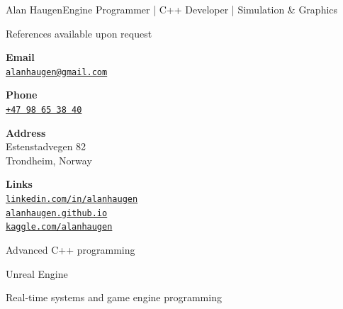\documentclass{article}
\begin{document}
\begin{cv}[avatar]{Alan Haugen}{Engine Programmer | C++ Developer | Simulation \& Graphics}
\cvseparator

\begin{cvevent}
References available upon request
\end{cvevent}

\cvsidebar


\begin{cvitem}[Envelope][4]
    \textbf{Email}\\
    \href{mailto:alanhaugen@gmail.com}{\texttt{alanhaugen@gmail.com}}
\end{cvitem}

\cvseparator[3]

\begin{cvitem}[Phone][4]
    \textbf{Phone}\\
    \href{tel:+4798653840}{\texttt{+47 98 65 38 40}}
\end{cvitem}

\cvseparator[3]

\begin{cvitem}[Home][4]
    \textbf{Address}\\
    Estenstadvegen 82\\
    Trondheim, Norway
\end{cvitem}

\cvseparator[3]

\begin{cvitem}[Globe][4]
    \textbf{Links}\\
    \href{https://linkedin.com/in/alanhaugen}{\texttt{linkedin.com/in/alanhaugen}}\\
    \href{https://alanhaugen.github.io/}{\texttt{alanhaugen.github.io}}\\
    \href{https://www.kaggle.com/alanhaugen/}{\texttt{kaggle.com/alanhaugen}}
\end{cvitem}


\cvseparator

\begin{cvitem}
    Advanced C++ programming
\end{cvitem}

\cvseparator

\begin{cvitem}
    Unreal Engine
\end{cvitem}

\cvseparator

\begin{cvitem}
    Real-time systems and game engine programming
\end{cvitem}


\end{cv}
\end{document}
